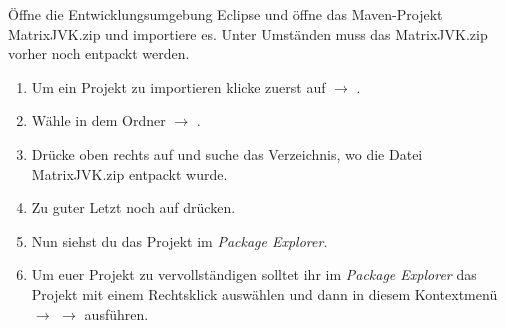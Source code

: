 \newcommand{\jvkpackage}{MatrixJVK.zip }

 Öffne die Entwicklungsumgebung Eclipse und öffne das Maven-Projekt \jvkpackage und importiere es.
 Unter Umständen muss das \jvkpackage vorher noch entpackt werden.
 \begin{enumerate}
     \item Um ein Projekt zu importieren klicke zuerst auf  $\rightarrow$      .
     \item Wähle in dem Ordner  $\to$ .
     \item Drücke oben rechts auf  und suche das Verzeichnis, wo die Datei \jvkpackage entpackt wurde.
     \item Zu guter Letzt noch auf  drücken.
     \item Nun siehst du das Projekt im \textit{Package Explorer}.
     \item Um euer Projekt zu vervollständigen solltet ihr im \textit{Package Explorer} das Projekt mit einem Rechtsklick auswählen und dann in diesem Kontextmenü  $\rightarrow$  $\rightarrow$  ausführen.
 \end{enumerate}
